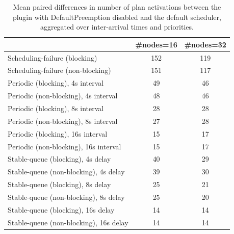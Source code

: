 \begin{table}[t]
\tiny
\setlength{\tabcolsep}{1.2pt}
\renewcommand{\arraystretch}{1.12}
\centering
\caption{Mean paired differences in number of plan activations between the plugin with DefaultPreemption disabled and the default scheduler, aggregated over inter-arrival times and priorities.}
\label{tab:plan_activations-defpreempt0-std0-agg-arrival-prio}
\begin{tabular}{l c c}
\toprule
 & \#nodes=16 & \#nodes=32 \\
\midrule
Scheduling-failure (blocking) & 152 & 119 \\
Scheduling-failure (non-blocking) & 151 & 117 \\
Periodic (blocking), 4s interval & 49 & 46 \\
Periodic (non-blocking), 4s interval & 48 & 46 \\
Periodic (blocking), 8s interval & 28 & 28 \\
Periodic (non-blocking), 8s interval & 27 & 28 \\
Periodic (blocking), 16s interval & 15 & 17 \\
Periodic (non-blocking), 16s interval & 15 & 17 \\
Stable-queue (blocking), 4s delay & 40 & 29 \\
Stable-queue (non-blocking), 4s delay & 39 & 30 \\
Stable-queue (blocking), 8s delay & 25 & 21 \\
Stable-queue (non-blocking), 8s delay & 25 & 20 \\
Stable-queue (blocking), 16s delay & 14 & 14 \\
Stable-queue (non-blocking), 16s delay & 14 & 14 \\
\bottomrule
\end{tabular}
\end{table}
